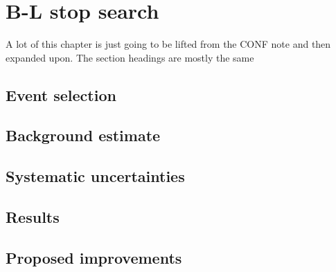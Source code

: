 \chapter[B-L stop search][B-L stop search]{B-L stop search}
\label{ch:bl_stop}

{\color{red}A lot of this chapter is just going to be lifted from the CONF note
  and then expanded upon. The section headings are mostly the same}

\section{Event selection}

\section{Background estimate}

\section{Systematic uncertainties}

\section{Results}

\section{Proposed improvements}

